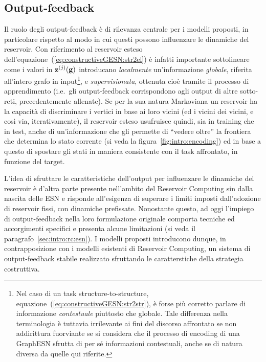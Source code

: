 \subsection{Output-feedback}\label{sec:modelli:constr:outfeedback}
Il ruolo degli output-feedback è di rilevanza centrale per i modelli proposti, in particolare rispetto al modo in cui questi possono influenzare le dinamiche del reservoir. Con riferimento al reservoir esteso dell'equazione~(\ref{eq:constructiveGESN:str2el}) è infatti importante sottolineare come i valori in $\mathbf{z}^{(j)}(\mathbf{g})$ introducano \emph{localmente} un'informazione \emph{globale}, riferita all'intero grafo in input\footnote{Nel caso di un task structure-to-structure, equazione~(\ref{eq:constructiveGESN:str2str}), è forse più corretto parlare di informazione \emph{contestuale} piuttosto che globale. Tale differenza nella terminologia è tuttavia irrilevante ai fini del discorso affrontato se non addirittura fuorviante se si considera che il processo di encoding di una GraphESN sfrutta di per sé informazioni contestuali, anche se di natura diversa da quelle qui riferite.}, e \emph{supervisionata}, ottenuta cioè tramite il processo di apprendimento (i.e.\ gli output-feedback corrispondono agli output di altre sotto-reti, precedentemente allenate). Se per la sua natura Markoviana un reservoir ha la capacità di discriminare i vertici in base ai loro vicini (ed i vicini dei vicini, e così via, iterativamente), il reservoir esteso usufruisce quindi, sia in training che in test, anche di un'informazione che gli permette di ``vedere oltre'' la frontiera che determina lo stato corrente (si veda la figura~\ref{fig:intro:encoding}) ed in base a questo di spostare gli stati in maniera consistente con il task affrontato, in funzione del target.

L'idea di sfruttare le caratteristiche dell'output per influenzare le dinamiche del reservoir è d'altra parte presente nell'ambito del Reservoir Computing sin dalla nascita delle ESN \cite{Jaeger:EchoStateApproach} e risponde all'esigenza di superare i limiti imposti dall'adozione di reservoir fissi, con dinamiche prefissate. Nonostante questo, ad oggi l'impiego di output-feedback nella loro formulazione originale comporta tecniche ed accorgimenti specifici \cite{Lukosevicius:ESNwithTrainedFeedbacks, Wyffels:stableOutputFeedback, Prokhorov:AppealAndChallenges} e presenta alcune limitazioni (si veda il paragrafo~\ref{sec:intro:rc:esn}).
I modelli proposti introducono dunque, in contrapposizione con i modelli esistenti di Reservoir Computing, un sistema di output-feedback stabile realizzato sfruttando le caratterstiche della strategia costruttiva.

